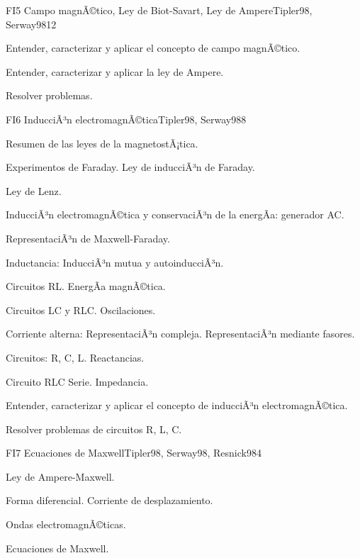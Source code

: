 \begin{syllabus}
\begin{unit}{FI5 Campo magnÃ©tico, Ley de Biot-Savart, Ley de Ampere}{Tipler98, Serway98}{12}
   \begin{unitgoals}
         \item  Entender, caracterizar y aplicar el concepto de campo magnÃ©tico.
         \item  Entender, caracterizar y aplicar la ley de Ampere.
         \item  Resolver problemas.
   \end{unitgoals}
\end{unit}

\begin{unit}{FI6 InducciÃ³n electromagnÃ©tica}{Tipler98, Serway98}{8}
   \begin{topics}
         \item  Resumen de las leyes de la magnetostÃ¡tica.
	 \item  Experimentos de Faraday.  Ley de inducciÃ³n de Faraday.
         \item  Ley de Lenz.
	 \item  InducciÃ³n electromagnÃ©tica y conservaciÃ³n de la energÃ­a: generador AC.
         \item  RepresentaciÃ³n de Maxwell-Faraday.
         \item  Inductancia: InducciÃ³n mutua y autoinducciÃ³n.
         \item  Circuitos RL.  EnergÃ­a magnÃ©tica.
         \item  Circuitos LC y RLC. Oscilaciones.
         \item  Corriente alterna: RepresentaciÃ³n compleja. RepresentaciÃ³n mediante fasores.
	 \item  Circuitos: R, C, L. Reactancias.
         \item  Circuito RLC Serie.  Impedancia.
   \end{topics}

   \begin{unitgoals}
         \item  Entender, caracterizar y aplicar el concepto de inducciÃ³n electromagnÃ©tica.
         \item  Resolver problemas de circuitos R, L, C.
   \end{unitgoals}
\end{unit}

\begin{unit}{FI7 Ecuaciones de Maxwell}{Tipler98, Serway98, Resnick98}{4}
   \begin{topics}
         \item  Ley de Ampere-Maxwell.
	 \item  Forma diferencial. Corriente de desplazamiento.
         \item  Ondas electromagnÃ©ticas.
	 \item  Ecuaciones de Maxwell.
   \end{topics}


\end{unit}
\end{syllabus}

